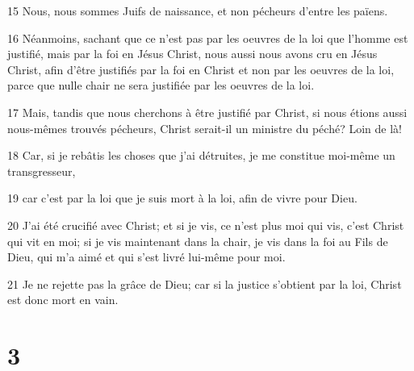 \par 15 Nous, nous sommes Juifs de naissance, et non pécheurs d'entre les païens.
\par 16 Néanmoins, sachant que ce n'est pas par les oeuvres de la loi que l'homme est justifié, mais par la foi en Jésus Christ, nous aussi nous avons cru en Jésus Christ, afin d'être justifiés par la foi en Christ et non par les oeuvres de la loi, parce que nulle chair ne sera justifiée par les oeuvres de la loi.
\par 17 Mais, tandis que nous cherchons à être justifié par Christ, si nous étions aussi nous-mêmes trouvés pécheurs, Christ serait-il un ministre du péché? Loin de là!
\par 18 Car, si je rebâtis les choses que j'ai détruites, je me constitue moi-même un transgresseur,
\par 19 car c'est par la loi que je suis mort à la loi, afin de vivre pour Dieu.
\par 20 J'ai été crucifié avec Christ; et si je vis, ce n'est plus moi qui vis, c'est Christ qui vit en moi; si je vis maintenant dans la chair, je vis dans la foi au Fils de Dieu, qui m'a aimé et qui s'est livré lui-même pour moi.
\par 21 Je ne rejette pas la grâce de Dieu; car si la justice s'obtient par la loi, Christ est donc mort en vain.

\chapter{3}


